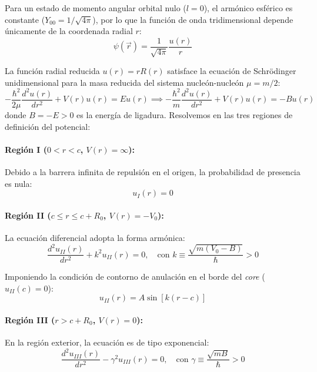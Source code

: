 \begin{problema}
Para un estado de momento angular orbital nulo ($l=0$), el armónico esférico es constante ($Y_{00} = 1/\sqrt{4\pi}$), por lo que la función de onda tridimensional depende únicamente de la coordenada radial $r$:
\begin{equation}
\psi(\vec{r}) = \frac{1}{\sqrt{4\pi}} \frac{u(r)}{r}
\end{equation}

La función radial reducida $u(r) = r R(r)$ satisface la ecuación de Schrödinger unidimensional para la masa reducida del sistema nucleón-nucleón $\mu = m/2$:
\begin{equation}
-\frac{\hbar^2}{2\mu} \frac{d^2 u(r)}{dr^2} + V(r) u(r) = E u(r) \implies -\frac{\hbar^2}{m} \frac{d^2 u(r)}{dr^2} + V(r) u(r) = -B u(r)
\end{equation}
donde $B = -E > 0$ es la energía de ligadura. Resolvemos en las tres regiones de definición del potencial:

\paragraph{Región I ($0 < r < c$, $V(r) = \infty$):}
Debido a la barrera infinita de repulsión en el origen, la probabilidad de presencia es nula:
\begin{equation}
u_I(r) = 0
\end{equation}

\paragraph{Región II ($c \le r \le c + R_0$, $V(r) = -V_0$):}
La ecuación diferencial adopta la forma armónica:
\begin{equation}
\frac{d^2 u_{II}(r)}{dr^2} + k^2 u_{II}(r) = 0, \quad \text{con } k \equiv \frac{\sqrt{m(V_0 - B)}}{\hbar} > 0
\end{equation}

Imponiendo la condición de contorno de anulación en el borde del \textit{core} ($u_{II}(c) = 0$):
\begin{equation}
u_{II}(r) = A \sin \left[ k (r - c) \right]
\end{equation}

\paragraph{Región III ($r > c + R_0$, $V(r) = 0$):}
En la región exterior, la ecuación es de tipo exponencial:
\begin{equation}
\frac{d^2 u_{III}(r)}{dr^2} - \gamma^2 u_{III}(r) = 0, \quad \text{con } \gamma \equiv \frac{\sqrt{m B}}{\hbar} > 0
\end{equation}


\end{problema}
